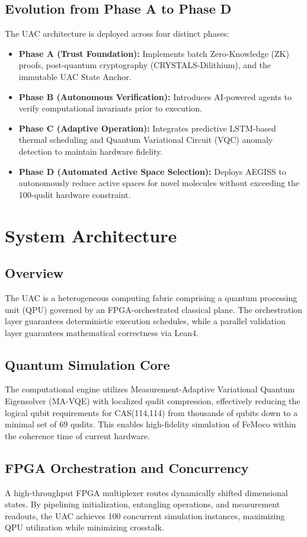 \documentclass[11pt,a4paper]{article}
\begin{document}
\subsection{Evolution from Phase A to Phase D}
The UAC architecture is deployed across four distinct phases:
\begin{itemize}
    \item \textbf{Phase A (Trust Foundation):} Implements batch Zero-Knowledge (ZK) proofs, post-quantum cryptography (CRYSTALS-Dilithium), and the immutable UAC State Anchor.
    \item \textbf{Phase B (Autonomous Verification):} Introduces AI-powered agents to verify computational invariants prior to execution.
    \item \textbf{Phase C (Adaptive Operation):} Integrates predictive LSTM-based thermal scheduling and Quantum Variational Circuit (VQC) anomaly detection to maintain hardware fidelity.
    \item \textbf{Phase D (Automated Active Space Selection):} Deploys AEGISS to autonomously reduce active spaces for novel molecules without exceeding the 100-qudit hardware constraint.
\end{itemize}

\section{System Architecture}
\subsection{Overview}
The UAC is a heterogeneous computing fabric comprising a quantum processing unit (QPU) governed by an FPGA-orchestrated classical plane. The orchestration layer guarantees deterministic execution schedules, while a parallel validation layer guarantees mathematical correctness via Lean4.

\subsection{Quantum Simulation Core}
The computational engine utilizes Measurement-Adaptive Variational Quantum Eigensolver (MA-VQE) with localized qudit compression, effectively reducing the logical qubit requirements for CAS(114,114) from thousands of qubits down to a minimal set of 69 qudits. This enables high-fidelity simulation of FeMoco within the coherence time of current hardware.

\subsection{FPGA Orchestration and Concurrency}
A high-throughput FPGA multiplexer routes dynamically shifted dimensional states. By pipelining initialization, entangling operations, and measurement readouts, the UAC achieves 100 concurrent simulation instances, maximizing QPU utilization while minimizing crosstalk.
\end{document}
